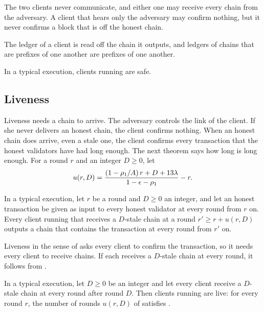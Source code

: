 The two clients never communicate, and either one may receive every chain from
the adversary. A client that hears only the adversary may confirm nothing, but
it never confirms a block that is off the honest chain.

The ledger of a client is read off the chain it outputs, and ledgers of chains
that are prefixes of one another are prefixes of one another.

\begin{corollary}\label{cor.ledgersafety}
    In a typical execution, clients running  are safe.
\end{corollary}

\subsection{Liveness}
\label{sec.liveness}

Liveness needs a chain to arrive. The adversary controls the link of the client.
If she never delivers an honest chain, the client confirms nothing.
When an honest chain does arrive, even a stale one, the client confirms every
transaction that the honest validators have had long enough. The next theorem
says how long is long enough. For a round $r$ and an integer $D\ge0$, let
\begin{equation}\label{eq.u}
    u(r,D)=\frac{(1-\rho_1/A)\,r+D+13\lambda}{1-\epsilon-\rho_1}-r .
\end{equation}

\begin{theorem}[Liveness]\label{thm.liveness}
    In a typical execution, let $r$ be a round and $D\ge0$ an integer, and let
    an honest transaction be given as input to every honest validator at every
    round from $r$ on. Every client running  that receives a
    $D$-stale chain at a round $r'\ge r+u(r,D)$ outputs a chain that contains
    the transaction at every round from $r'$ on.
\end{theorem}

Liveness in the sense of  asks every client to confirm the
transaction, so it needs every client to receive chains. If each receives a
$D$-stale chain at every round, it follows from .

\begin{corollary}\label{cor.ledgerliveness}
    In a typical execution, let $D\ge0$ be an integer and let every client
    receive a $D$-stale chain at every round after round $D$. Then clients
    running  are live: for every round $r$, the number of
    rounds $u(r,D)$ of  satisfies .
\end{corollary}


